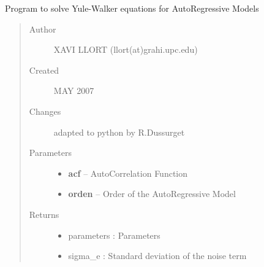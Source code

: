 \documentclass[letterpaper,10pt,english]{sphinxmanual}
\begin{document}
\begin{fulllineitems}
\label{altimetry.tools.spectrum:altimetry.tools.spectrum.yule_walker}
Program to solve Yule-Walker equations for AutoRegressive Models
\begin{quote}\begin{description}
\item[{Author }] \leavevmode
XAVI LLORT (llort(at)grahi.upc.edu)

\item[{Created }] \leavevmode
MAY 2007

\item[{Changes }] \leavevmode
adapted to python by R.Dussurget

\item[{Parameters}] \leavevmode\begin{itemize}
\item {} 
\textbf{acf} -- AutoCorrelation Function

\item {} 
\textbf{orden} -- Order of the AutoRegressive Model

\end{itemize}

\item[{Returns}] \leavevmode
\begin{itemize}
\item {} 
parameters : Parameters

\item {} 
sigma\_e : Standard deviation of the noise term

\end{itemize}


\end{description}\end{quote}

\end{fulllineitems}

\end{document}
